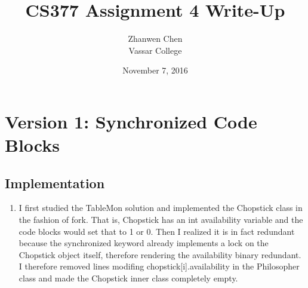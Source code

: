 \documentclass{article}
\begin{document}
\title{CS377 Assignment 4 Write-Up}
\date{November 7, 2016}
\author{Zhanwen Chen\\Vassar College}
\maketitle

\section{Version 1: Synchronized Code Blocks}

\subsection{Implementation}

\begin{enumerate}
	\item [] I first studied the TableMon solution and implemented the Chopstick class in the fashion of fork. That is, Chopstick has an int availability variable and the code blocks would set that to 1 or 0. Then I realized it is in fact redundant because the synchronized keyword already implements a lock on the Chopstick object itself, therefore rendering the availability binary redundant. I therefore removed lines modifing chopstick[i].availability in the Philosopher class and made the Chopstick inner class completely empty.
	
\end{enumerate}
\end{document}
